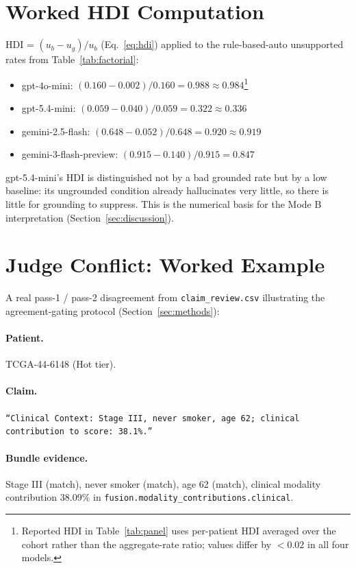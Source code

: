 \documentclass[11pt]{article}
\begin{document}
\section{Worked HDI Computation}
\label{app:hdi-math}

HDI = $(u_b - u_g)/u_b$ (Eq.~\ref{eq:hdi}) applied to the rule-based-auto unsupported rates from Table~\ref{tab:factorial}:

\begin{itemize}
\item gpt-4o-mini: $(0.160 - 0.002)/0.160 = 0.988 \approx 0.984$\footnote{Reported HDI in Table~\ref{tab:panel} uses per-patient HDI averaged over the cohort rather than the aggregate-rate ratio; values differ by $<0.02$ in all four models.}
\item gpt-5.4-mini: $(0.059 - 0.040)/0.059 = 0.322 \approx 0.336$
\item gemini-2.5-flash: $(0.648 - 0.052)/0.648 = 0.920 \approx 0.919$
\item gemini-3-flash-preview: $(0.915 - 0.140)/0.915 = 0.847$
\end{itemize}

gpt-5.4-mini's HDI is distinguished not by a bad grounded rate but by a low baseline: its ungrounded condition already hallucinates very little, so there is little for grounding to suppress. This is the numerical basis for the Mode B interpretation (Section~\ref{sec:discussion}).

\section{Judge Conflict: Worked Example}
\label{app:conflict}

A real pass-1 / pass-2 disagreement from \texttt{claim\_review.csv} illustrating the agreement-gating protocol (Section~\ref{sec:methods}):

\paragraph{Patient.} TCGA-44-6148 (Hot tier).

\paragraph{Claim.} \texttt{``Clinical Context: Stage III, never smoker, age 62; clinical contribution to score: 38.1\%.''}

\paragraph{Bundle evidence.} Stage III (match), never smoker (match), age 62 (match), clinical modality contribution 38.09\% in \texttt{fusion.modality\_contributions.clinical}.
\end{document}
